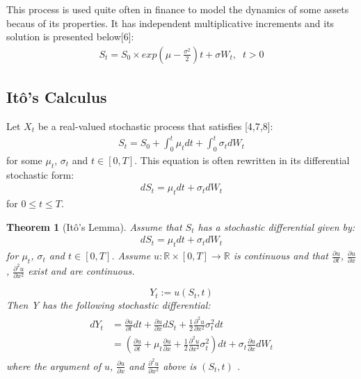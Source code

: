 \documentclass[12pt,twoside]{reedthesis}
\newtheorem{theorem}{Theorem}[section]
\theoremstyle{definition}
\theoremstyle{definition}
\theoremstyle{remark}
\begin{document}
  This process is used quite often in finance to model the dynamics of
  some assets becaus of its properties. It has independent multiplicative
  increments and its solution is presented below{[}6{]}:
  \begin{align}
  S_t = S_0 \times exp{\left(\mu - \frac{\sigma^2}{2} \right) t + \sigma W_t}, \;\; t > 0
  \end{align}
  \subsection{Itô's Calculus}\label{itos-calculus}
  
  Let \(X_{t}\) be a real-valued stochastic process that satisfies
  {[}4,7,8{]}:
  \begin{align}
  S_t = S_0 + \int_{0}^{t} \mu_t dt + \int_{0}^{t} \sigma_t dW_t
  \end{align}
  \noindent
  for some \(\mu_t\), \(\sigma_t\) and \(t \in [0,T]\). This equation is
  often rewritten in its differential stochastic form:
  \begin{align}
  dS_t = \mu_t dt + \sigma_t dW_t 
  \end{align}
  \noindent
  for \(0 \leq t \leq T\).
  \begin{theorem}[Itô's Lemma]
  Assume that $S_t$ has a stochastic differential given by:
  \begin{align}
  dS_t = \mu_t dt + \sigma_t dW_t 
  \end{align}
  \noindent
  for $\mu_t$, $\sigma_t$ and $t \in [0,T]$. Assume $u: \mathbb{R} \times [0, T] \rightarrow \mathbb{R}$ is continuous and that $\frac{\partial u}{\partial t}$, $\frac{\partial u}{\partial x}$, $\frac{\partial^2 u}{\partial x^2}$ exist and are continuous.
  
  $$Y_t := u(S_t, t)$$
  \noindent
  Then Y has the following stochastic differential:
  \begin{align} 
  \label{eq:ito}
  \begin{split}
      dY_t &= \frac{\partial u}{\partial t}dt + \frac{\partial u}{\partial x} dS_t + \frac{1}{2}\frac{\partial^2 u}{\partial x^2}\sigma_t^2 dt  \\[10pt] 
      &= \left( \frac{\partial u}{\partial t} + \mu_t \frac{\partial u}{\partial x} + \frac{1}{2}\frac{\partial^2 u}{\partial x^2}\sigma_t^2 \right) dt + \sigma_t \frac{\partial u}{\partial x} dW_t
  \end{split}
  \end{align}
  \noindent 
  where the argument of $u$, $\frac{\partial u}{\partial x}$ and $\frac{\partial^2 u}{\partial x^2}$ above is $\left( S_t, t \right)$ .
  \end{theorem}
\end{document}
